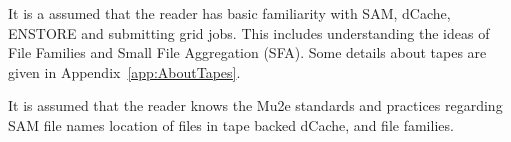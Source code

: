 It is a assumed that the reader has basic familiarity with SAM, dCache, ENSTORE and submitting grid jobs.
This includes understanding the ideas of File Families and Small File Aggregation (SFA).
Some details about tapes are given in Appendix~\ref{app:AboutTapes}.

It is assumed that the reader knows the Mu2e standards and practices regarding SAM file names\cite{Mu2eSAM}
location of files in tape backed dCache\cite{FileNames}, and file families.
